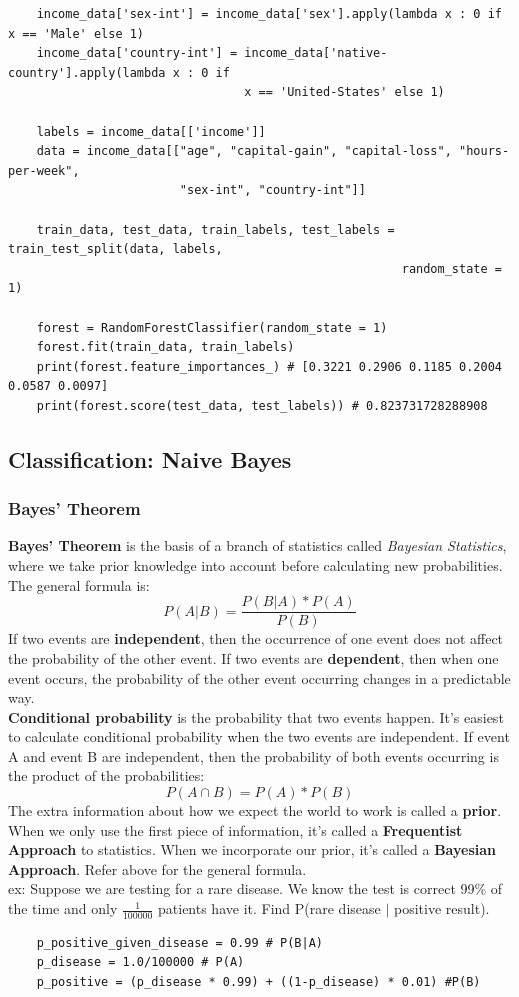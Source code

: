 \documentclass[11pt, a4paper]{article}
\begin{document}
\begin{spacing}{1.1}
\begin{lstlisting}
	income_data['sex-int'] = income_data['sex'].apply(lambda x : 0 if x == 'Male' else 1)
	income_data['country-int'] = income_data['native-country'].apply(lambda x : 0 if 
	                             x == 'United-States' else 1)
	
	labels = income_data[['income']]
	data = income_data[["age", "capital-gain", "capital-loss", "hours-per-week", 
	                    "sex-int", "country-int"]]
	
	train_data, test_data, train_labels, test_labels = train_test_split(data, labels, 
	                                                   random_state = 1)
	
	forest = RandomForestClassifier(random_state = 1)
	forest.fit(train_data, train_labels)
	print(forest.feature_importances_) # [0.3221 0.2906 0.1185 0.2004 0.0587 0.0097]
	print(forest.score(test_data, test_labels)) # 0.823731728288908 \end{lstlisting} \newpage

	\subsection{Classification: Naive Bayes}
	\subsubsection{Bayes' Theorem}
	\textbf{Bayes’ Theorem} is the basis of a branch of statistics called \textit{Bayesian Statistics}, where we take prior knowledge into account before calculating new probabilities. The general formula is: $$ P(A|B) = \frac{P(B|A) * P(A)}{P(B)} $$
	If two events are \textbf{independent}, then the occurrence of one event does not affect the probability of the other event. If two events are \textbf{dependent}, then when one event occurs, the probability of the other event occurring changes in a predictable way. \vspace*{1mm} \\
	\textbf{Conditional probability} is the probability that two events happen. It’s easiest to calculate conditional probability when the two events are independent. If event A and event B are independent, then the probability of both events occurring is the product of the probabilities: $$ P(A \cap B) = P(A) * P(B) $$ 
	The extra information about how we expect the world to work is called a \textbf{prior}. When we only use the first piece of information, it’s called a \textbf{Frequentist Approach} to statistics. When we incorporate our prior, it’s called a \textbf{Bayesian Approach}. Refer above for the general formula. \vspace*{1mm} \\
	ex: Suppose we are testing for a rare disease. We know the test is correct 99\% of the time and only $\frac{1}{100000}$ patients have it. Find P(rare disease $|$ positive result).
	\begin{lstlisting}
	p_positive_given_disease = 0.99 # P(B|A)
	p_disease = 1.0/100000 # P(A)
	p_positive = (p_disease * 0.99) + ((1-p_disease) * 0.01) #P(B)
	

\end{lstlisting}
\end{spacing}
\end{document}

